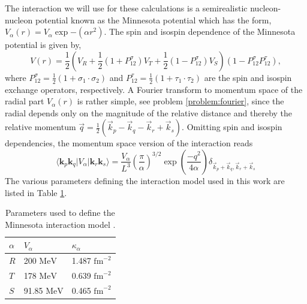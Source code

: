 The interaction we will use for these calculations is a semirealistic
nucleon-nucleon potential known as the Minnesota potential
\cite{minnesota} which has the form, $V_{\alpha}\left(
r\right)=V_{\alpha}\exp{-(\alpha r^{2})}$. The spin and isospin
dependence of the Minnesota potential is given by,
\begin{equation}
V\left( r\right)=\frac{1}{2}\left( V_{R}+\frac{1}{2}\left(
1+P_{12}^{\sigma}\right) V_{T}+\frac{1}{2}\left(
1-P_{12}^{\sigma}\right) V_{S}\right)\left(
1-P_{12}^{\sigma}P_{12}^{\tau}\right),
\end{equation}
where $P_{12}^{\sigma}=\frac{1}{2}\left(
1+\sigma_{1}\cdot\sigma_{2}\right)$ and
$P_{12}^{\tau}=\frac{1}{2}\left( 1+\tau_{1}\cdot\tau_{2}\right)$ are
the spin and isospin exchange operators, respectively. A Fourier
transform to momentum space of the radial part $V_{\alpha}\left(
r\right)$ is rather simple, see problem \ref{problem:fourier}, since
the radial depends only on the magnitude of the relative distance and
thereby the relative momentum
$\vec{q}=\frac{1}{2}\left(\vec{k}_{p}-\vec{k}_{q}-\vec{k}_{r}+\vec{k}_{s}\right)$. Omitting
spin and isospin dependencies, the momentum space version of the
interaction reads
\begin{equation}
\langle \mathbf{k}_p \mathbf{k}_q \vert V_{\alpha}\vert
\mathbf{k}_r\mathbf{k}_s\rangle=\frac{V_{\alpha}}{L^{3}}\left(\frac{\pi}{\alpha}\right)^{3/2}\exp{(\frac{-q^{2}}{4\alpha})}\delta_{\vec{k}_{p}+\vec{k}_{q},\vec{k}_{r}+\vec{k}_{s}}
\end{equation}
The various parameters defining the interaction model used in this
work are listed in Table \ref{tab:minnesotatab}.
\begin{table}
\caption{Parameters used to define the Minnesota interaction model
  \cite{minnesota}.}\label{tab:minnesotatab}
\begin{center}
  \begin{tabular}{| l | l | l |}
    \hline $\alpha$ & $V_{\alpha}$ & $\kappa_{\alpha}$ \\ \hline $R$ &
    200 $\mathrm{MeV}$ & 1.487 $\mathrm{fm}^{-2}$ \\ \hline $T$ & 178
    $\mathrm{MeV}$ & 0.639 $\mathrm{fm}^{-2}$ \\ \hline $S$ & 91.85
    $\mathrm{MeV}$ & 0.465 $\mathrm{fm}^{-2}$ \\ \hline
  \end{tabular}
\end{center}
\end{table}


